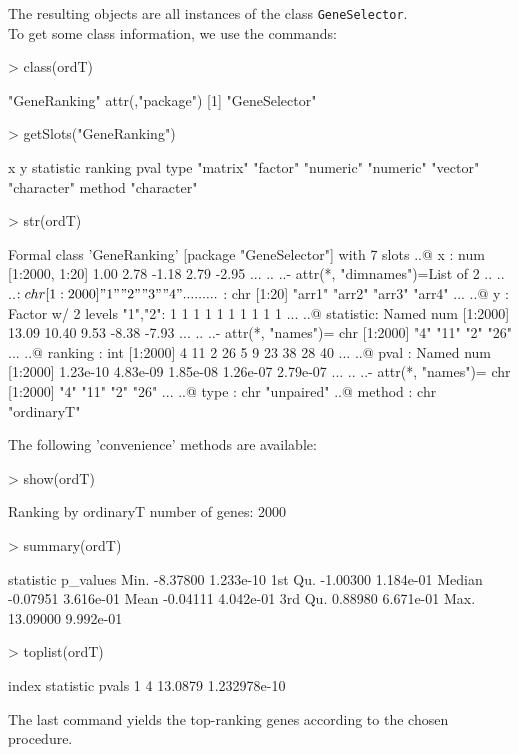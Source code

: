 The resulting objects are all instances of the class \texttt{GeneSelector}.\\
To get some class information, we use the commands:

\begin{Schunk}
\begin{Sinput}
> class(ordT)
\end{Sinput}
\begin{Soutput}
[1] "GeneRanking"
attr(,"package")
[1] "GeneSelector"
\end{Soutput}
\begin{Sinput}
> getSlots("GeneRanking")
\end{Sinput}
\begin{Soutput}
          x           y   statistic     ranking        pval        type 
   "matrix"    "factor"   "numeric"   "numeric"    "vector" "character" 
     method 
"character" 
\end{Soutput}
\begin{Sinput}
> str(ordT)
\end{Sinput}
\begin{Soutput}
Formal class 'GeneRanking' [package "GeneSelector"] with 7 slots
  ..@ x        : num [1:2000, 1:20]  1.00  2.78 -1.18  2.79 -2.95 ...
  .. ..- attr(*, "dimnames")=List of 2
  .. .. ..$ : chr [1:2000] "1" "2" "3" "4" ...
  .. .. ..$ : chr [1:20] "arr1" "arr2" "arr3" "arr4" ...
  ..@ y        : Factor w/ 2 levels "1","2": 1 1 1 1 1 1 1 1 1 1 ...
  ..@ statistic: Named num [1:2000] 13.09 10.40  9.53 -8.38 -7.93 ...
  .. ..- attr(*, "names")= chr [1:2000] "4" "11" "2" "26" ...
  ..@ ranking  : int [1:2000] 4 11 2 26 5 9 23 38 28 40 ...
  ..@ pval     : Named num [1:2000] 1.23e-10 4.83e-09 1.85e-08 1.26e-07 2.79e-07 ...
  .. ..- attr(*, "names")= chr [1:2000] "4" "11" "2" "26" ...
  ..@ type     : chr "unpaired"
  ..@ method   : chr "ordinaryT"
\end{Soutput}
\end{Schunk}

The following 'convenience' methods are available:

\begin{Schunk}
\begin{Sinput}
> show(ordT)
\end{Sinput}
\begin{Soutput}
Ranking by ordinaryT
number of genes: 2000
\end{Soutput}
\begin{Sinput}
> summary(ordT)
\end{Sinput}
\begin{Soutput}
        statistic  p_values
Min.     -8.37800 1.233e-10
1st Qu.  -1.00300 1.184e-01
Median   -0.07951 3.616e-01
Mean     -0.04111 4.042e-01
3rd Qu.   0.88980 6.671e-01
Max.     13.09000 9.992e-01
\end{Soutput}
\begin{Sinput}
> toplist(ordT)
\end{Sinput}
\begin{Soutput}
  index statistic        pvals
1     4   13.0879 1.232978e-10
\end{Soutput}
\end{Schunk}
The last command yields the top-ranking genes according to the chosen procedure.

